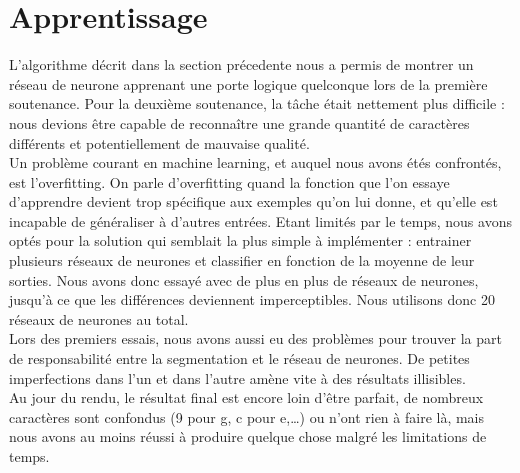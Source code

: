 \section{Apprentissage}
L'algorithme décrit dans la section précedente nous a permis de montrer un réseau de neurone apprenant une porte logique quelconque lors de la première soutenance. Pour la deuxième soutenance, la tâche était nettement plus difficile : nous devions être capable de reconnaître une grande quantité de caractères différents et potentiellement de mauvaise qualité.\\
Un problème courant en machine learning, et auquel nous avons étés confrontés, est l'overfitting. On parle d'overfitting quand la fonction que l'on essaye d'apprendre devient trop spécifique aux exemples qu'on lui donne, et qu'elle est incapable de généraliser à d'autres entrées. Etant limités par le temps, nous avons optés pour la solution qui semblait la plus simple à implémenter : entrainer plusieurs réseaux de neurones et classifier en fonction de la moyenne de leur sorties. Nous avons donc essayé avec de plus en plus de réseaux de neurones, jusqu'à ce que les différences deviennent imperceptibles. Nous utilisons donc 20 réseaux de neurones au total.\\
Lors des premiers essais, nous avons aussi eu des problèmes pour trouver la part de responsabilité entre la segmentation et le réseau de neurones. De petites imperfections dans l'un et dans l'autre amène vite à des résultats illisibles.\\
Au jour du rendu, le résultat final est encore loin d'être parfait, de nombreux
caractères sont confondus (9 pour g, c pour e,\ldots ) ou n'ont rien à faire là,
mais nous avons au moins réussi à produire quelque chose malgré les limitations
de temps. \\

